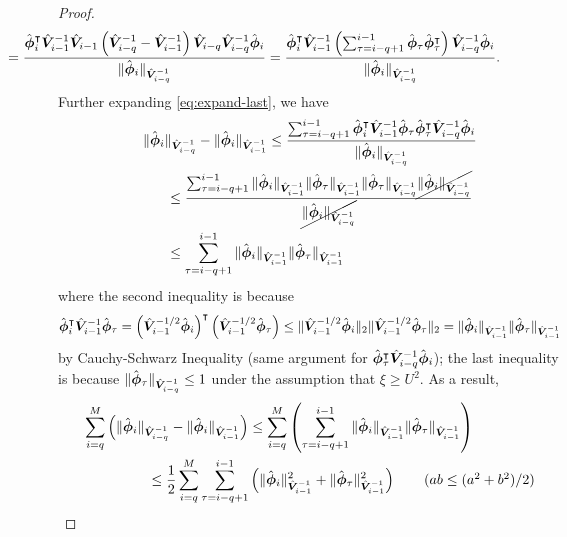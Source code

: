 \begin{proof}
\begin{align}
&\hspace{-1in}=\frac{\hat{\bphi}_i^{\trans}\hat{\bV}_{i-1}^{-1}\hat{\bV}_{i-1}\left(\hat{\bV}_{i-q}^{-1}-\hat{\bV}_{i-1}^{-1}\right)\hat{\bV}_{i-q}\hat{\bV}_{i-q}^{-1}\hat{\bphi}_i}{\|\hat{\bphi}_i\|_{\hat{\bV}_{i-q}^{-1}}} = \frac{\hat{\bphi}_i^{\trans}\hat{\bV}_{i-1}^{-1}\left(\sum_{\tau=i-q+1}^{i-1} \hat{\bphi}_{\tau}\hat{\bphi}_{\tau}^{\trans}\right)\hat{\bV}_{i-q}^{-1}\hat{\bphi}_i}{\|\hat{\bphi}_i\|_{\hat{\bV}_{i-q}^{-1}}}. \label{eq:expand-last}
\end{align}
Further expanding \eqref{eq:expand-last}, we have
\begin{align*}
\|\hat{\bphi}_i\|_{\hat{\bV}_{i-q}^{-1}} - \|\hat{\bphi}_i\|_{\hat{\bV}_{i-1}^{-1}} &\leq \frac{\sum_{\tau=i-q+1}^{i-1} \hat{\bphi}_i^{\trans}\hat{\bV}_{i-1}^{-1}\hat{\bphi}_{\tau}\hat{\bphi}_{\tau}^{\trans}\hat{\bV}_{i-q}^{-1}\hat{\bphi}_i}{\|\hat{\bphi}_i\|_{\hat{\bV}_{i-q}^{-1}}} \\
&\hspace{-1in}\leq \frac{\sum_{\tau=i-q+1}^{i-1} \|\hat{\bphi}_i\|_{\hat{\bV}_{i-1}^{-1}}\|\hat{\bphi}_{\tau}\|_{\hat{\bV}_{i-1}^{-1}}\|\hat{\bphi}_{\tau}\|_{\hat{\bV}_{i-q}^{-1}}\cancel{\|\hat{\bphi}_i\|_{\hat{\bV}_{i-q}^{-1}}}}{\cancel{\|\hat{\bphi}_i\|_{\hat{\bV}_{i-q}^{-1}}}} \\
&\hspace{-1in}\leq \sum_{\tau=i-q+1}^{i-1} \|\hat{\bphi}_i\|_{\hat{\bV}_{i-1}^{-1}}\|\hat{\bphi}_{\tau}\|_{\hat{\bV}_{i-1}^{-1}}
\end{align*}
where the second inequality is because \[\hat{\boldsymbol{\phi}}_i^{\intercal}\hat{\boldsymbol{V}}_{i-1}^{-1}\hat{\boldsymbol{\phi}}_{\tau} = \left(\hat{\boldsymbol{V}}_{i-1}^{-1/2}\hat{\boldsymbol{\phi}}_i\right)^{\intercal}\left(\hat{\boldsymbol{V}}_{i-1}^{-1/2}\hat{\boldsymbol{\phi}}_{\tau}\right) \leq \|\hat{\boldsymbol{V}}_{i-1}^{-1/2}\hat{\boldsymbol{\phi}}_i\|_2 \|\hat{\boldsymbol{V}}_{i-1}^{-1/2}\hat{\boldsymbol{\phi}}_{\tau}\|_2 = \|\hat{\boldsymbol{\phi}}_i\|_{\hat{\boldsymbol{V}}_{i-1}^{-1}}\|\hat{\boldsymbol{\phi}}_{\tau}\|_{\hat{\boldsymbol{V}}_{i-1}^{-1}}\]
by Cauchy-Schwarz Inequality (same argument for $\hat{\boldsymbol{\phi}}_{\tau}^{\intercal}\hat{\boldsymbol{V}}_{i-q}^{-1}\hat{\boldsymbol{\phi}}_i$); the last inequality is because $\|\hat{\boldsymbol{\phi}}_{\tau}\|_{\hat{\boldsymbol{V}}_{i-q}^{-1}} \leq 1$ under the assumption that $\xi \geq U^2$. As a result, 
\begin{align}
\sum_{i=q}^M \left(\|\hat{\bphi}_i\|_{\hat{\bV}_{i-q}^{-1}} - \|\hat{\bphi}_i\|_{\hat{\bV}_{i-1}^{-1}}\right) &\leq \sum_{i=q}^M \left(\sum_{\tau=i-q+1}^{i-1} \|\hat{\bphi}_i\|_{\hat{\bV}_{i-1}^{-1}}\|\hat{\bphi}_{\tau}\|_{\hat{\bV}_{i-1}^{-1}}\right) \nonumber\\
&\hspace{-1in}\leq \frac{1}{2}\sum_{i=q}^M \sum_{\tau=i-q+1}^{i-1} \left(\|\hat{\bphi}_i\|_{\hat{\bV}_{i-1}^{-1}}^2 + \|\hat{\bphi}_{\tau}\|_{\hat{\bV}_{i-1}^{-1}}^2\right) \tag{$ab \leq (a^2+b^2) / 2$} \nonumber\\

\end{align}
\end{proof}
